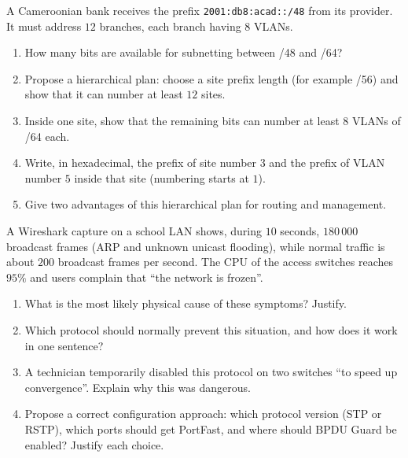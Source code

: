 \documentclass[11pt]{article}
\begin{document}
\begin{exercice}
A Cameroonian bank receives the prefix \texttt{2001:db8:acad::/48} from its provider. It must address $12$ branches, each branch having $8$ VLANs.
\begin{enumerate}
\item How many bits are available for subnetting between /48 and /64?
\item Propose a hierarchical plan: choose a site prefix length (for example /56) and show that it can number at least $12$ sites.
\item Inside one site, show that the remaining bits can number at least $8$ VLANs of /64 each.
\item Write, in hexadecimal, the prefix of site number $3$ and the prefix of VLAN number $5$ inside that site (numbering starts at $1$).
\item Give two advantages of this hierarchical plan for routing and management.
\end{enumerate}
\end{exercice}

\begin{exercice}
A Wireshark capture on a school LAN shows, during $10$ seconds, $180\,000$ broadcast frames (ARP and unknown unicast flooding), while normal traffic is about $200$ broadcast frames per second. The CPU of the access switches reaches $95\%$ and users complain that ``the network is frozen''.
\begin{enumerate}
\item What is the most likely physical cause of these symptoms? Justify.
\item Which protocol should normally prevent this situation, and how does it work in one sentence?
\item A technician temporarily disabled this protocol on two switches ``to speed up convergence''. Explain why this was dangerous.
\item Propose a correct configuration approach: which protocol version (STP or RSTP), which ports should get PortFast, and where should BPDU Guard be enabled? Justify each choice.
\end{enumerate}
\end{exercice}
\end{document}
